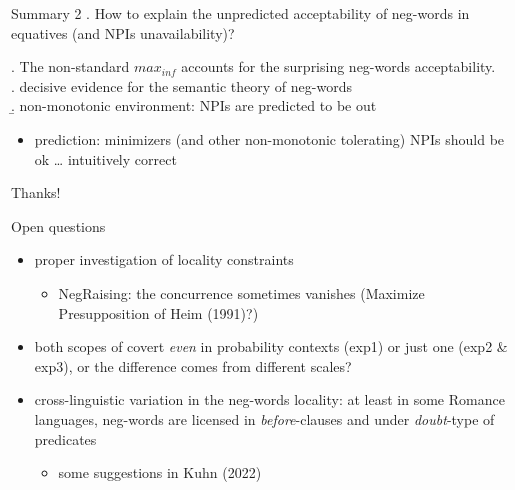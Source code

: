 \documentclass[
  ignorenonframetext,
]{beamer}
\providecommand{\tightlist}{%
  \setlength{\itemsep}{0pt}\setlength{\parskip}{0pt}}\usepackage{longtable,booktabs,array}
\begin{document}
\begin{frame}
\begin{block}{Summary 2}
\protect\hypertarget{summary-2}{}
\ex. How to explain the unpredicted acceptability of neg-words in
equatives (and NPIs unavailability)?

\ex. The non-standard \(max_{inf}\) accounts for the surprising
neg-words acceptability.\\
\a. decisive evidence for the semantic theory of neg-words\\
\b. non-monotonic environment: NPIs are predicted to be out

\begin{itemize}
\tightlist
\item
  prediction: minimizers (and other non-monotonic tolerating) NPIs
  should be ok \ldots{} intuitively correct
\end{itemize}
\end{block}
\end{frame}

\begin{frame}
\begin{center}
\Huge Thanks!
\end{center}

\normalsize
\end{frame}

\begin{frame}
\begin{block}{Open questions}
\protect\hypertarget{open-questions}{}
\begin{itemize}
\tightlist
\item
  proper investigation of locality constraints

  \begin{itemize}
  \tightlist
  \item
    NegRaising: the concurrence sometimes vanishes (Maximize
    Presupposition of Heim (1991)?)
  \end{itemize}
\item
  both scopes of covert \emph{even} in probability contexts (exp1) or
  just one (exp2 \& exp3), or the difference comes from different
  scales?
\item
  cross-linguistic variation in the neg-words locality: at least in some
  Romance languages, neg-words are licensed in \emph{before}-clauses and
  under \emph{doubt}-type of predicates

  \begin{itemize}
  \tightlist
  \item
    some suggestions in Kuhn (2022)
  \end{itemize}
\end{itemize}
\end{block}
\end{frame}
\end{document}
